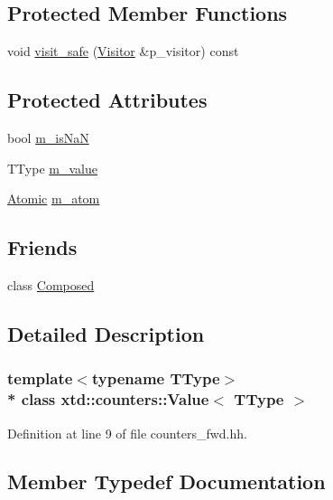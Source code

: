 \subsection*{Protected Member Functions}
\begin{DoxyCompactItemize}
\item 
void \hyperlink{classxtd_1_1counters_1_1Value_a7be35e9a5a52891c5946425152b4db30}{visit\+\_\+safe} (\hyperlink{classxtd_1_1counters_1_1Visitor}{Visitor} \&p\+\_\+visitor) const 
\end{DoxyCompactItemize}
\subsection*{Protected Attributes}
\begin{DoxyCompactItemize}
\item 
bool \hyperlink{classxtd_1_1counters_1_1Value_a28be66961121bb488351e2c2722fd18a}{m\+\_\+is\+NaN}
\item 
T\+Type \hyperlink{classxtd_1_1counters_1_1Value_abe06c1cebededaf2f216707171f63c3c}{m\+\_\+value}
\item 
\hyperlink{classxtd_1_1counters_1_1Atomic}{Atomic} \hyperlink{classxtd_1_1counters_1_1Value_a0cf45c8f82588321af127529ba4f214a}{m\+\_\+atom}
\end{DoxyCompactItemize}
\subsection*{Friends}
\begin{DoxyCompactItemize}
\item 
class \hyperlink{classxtd_1_1counters_1_1Value_a93e934ad70d5b32b14beed5572450abf}{Composed}
\end{DoxyCompactItemize}


\subsection{Detailed Description}
\subsubsection*{template$<$typename T\+Type$>$\\*
class xtd\+::counters\+::\+Value$<$ T\+Type $>$}



Definition at line 9 of file counters\+\_\+fwd.\+hh.



\subsection{Member Typedef Documentation}
